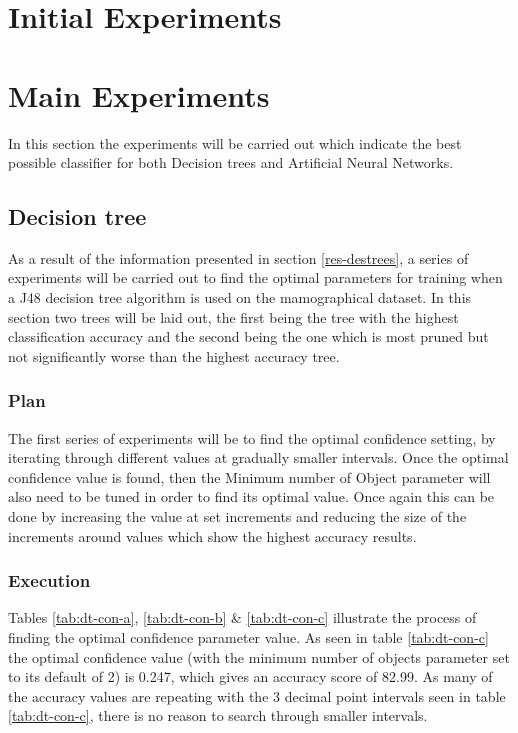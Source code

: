 \documentclass[12pt]{article}
\begin{document}
\section{Initial Experiments}



\section{Main Experiments}
  In this section the experiments will be carried out which indicate the best possible classifier for both Decision trees and Artificial Neural Networks.

  \subsection{Decision tree}
    As a result of the information presented in section \ref{res-destrees}, a series of experiments will be carried out to find the optimal parameters for training when a J48 decision tree algorithm is used on the mamographical dataset. In this section two trees will be laid out, the first being the tree with the highest classification accuracy and the second being the one which is most pruned but not significantly worse than the highest accuracy tree.

    \subsubsection{Plan}
      The first series of experiments will be to find the optimal confidence setting, by iterating through different values at gradually smaller intervals. Once the optimal confidence value is found, then the Minimum number of Object parameter will also need to be tuned in order to find its optimal value. Once again this can be done by increasing the value at set increments and reducing the size of the increments around values which show the highest accuracy results.

    \subsubsection{Execution} \label{dt-execution}
      Tables \ref{tab:dt-con-a}, \ref{tab:dt-con-b} \& \ref{tab:dt-con-c} illustrate the process of finding the optimal confidence parameter value. As seen in table \ref{tab:dt-con-c} the optimal confidence value (with the minimum number of objects parameter set to its default of 2) is 0.247, which gives an accuracy score of 82.99. As many of the accuracy values are repeating with the 3 decimal point intervals seen in table \ref{tab:dt-con-c}, there is no reason to search through smaller intervals.
\end{document}

